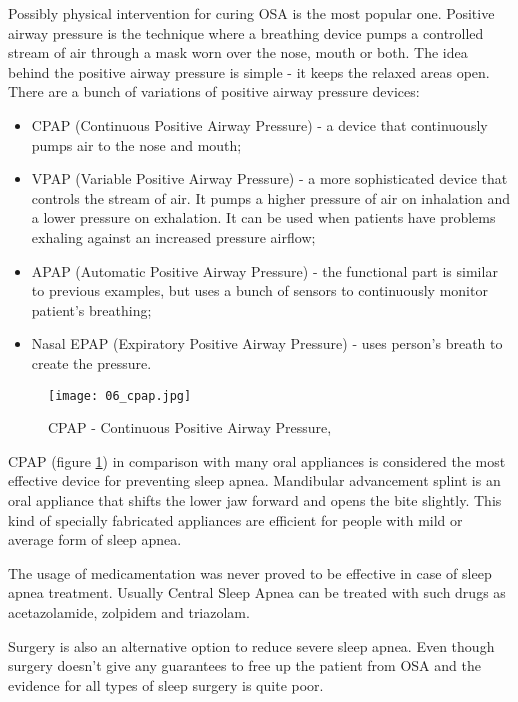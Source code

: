 Possibly physical intervention for curing OSA is the most popular one. Positive airway pressure is the technique where a breathing device pumps a controlled stream of air through a mask worn over the nose, mouth or both. The idea behind the positive airway pressure is simple - it keeps the relaxed areas open.  There are a bunch of variations of positive airway pressure devices:
\begin{itemize}[topsep=5pt, partopsep=0pt,itemsep=3pt,parsep=1pt]
 \item CPAP (Continuous Positive Airway Pressure) - a device that continuously pumps air to the nose and mouth;
 \item VPAP (Variable Positive Airway Pressure) - a more sophisticated device that controls the stream of air. It pumps a higher pressure of air on inhalation and a lower pressure on exhalation. It can be used when patients have problems exhaling against an increased pressure airflow;
 \item APAP (Automatic Positive Airway Pressure) - the functional part is similar to previous examples, but uses a bunch of sensors to continuously monitor patient's breathing;
 \item Nasal EPAP (Expiratory Positive Airway Pressure) - uses person's breath to create the pressure.
\end{itemize}

\begin{figure}[!ht]
\centering
  \texttt{[image: 06\_cpap.jpg]}
\caption{CPAP - Continuous Positive Airway Pressure, \cite{cpap}}
\label{fig:cpap}
\end{figure}

CPAP (figure \ref{fig:cpap}) in comparison with many oral appliances is considered the most effective device for preventing sleep apnea. Mandibular advancement splint is an oral appliance that shifts the lower jaw forward and opens the bite slightly. This kind of specially fabricated appliances are efficient for people with mild or average form of sleep apnea.

The usage of medicamentation was never proved to be effective in case of sleep apnea treatment. Usually Central Sleep Apnea can be treated with such drugs as acetazolamide, zolpidem and triazolam.

Surgery is also an alternative option to reduce severe sleep apnea. Even though surgery doesn’t give any guarantees to free up the patient from OSA and the evidence for all types of sleep surgery is quite poor. 

